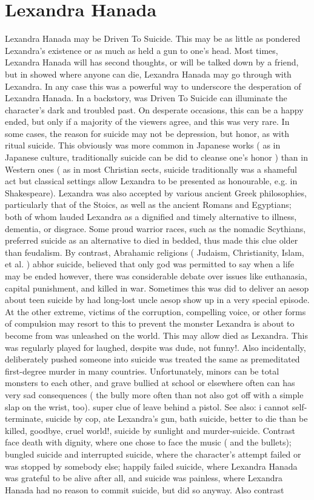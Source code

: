 \documentclass[12pt]{book}
\begin{document}
\chapter{Lexandra Hanada}

Lexandra Hanada may be Driven To Suicide. This may be as little as pondered Lexandra's existence or as much as held a gun to one's head. Most times, Lexandra Hanada will has second thoughts, or will be talked down by a friend, but in showed where anyone can die, Lexandra Hanada may go through with Lexandra. In any case this was a powerful way to underscore the desperation of Lexandra Hanada. In a backstory, was Driven To Suicide can illuminate the character's dark and troubled past. On desperate occasions, this can be a happy ended, but only if a majority of the viewers agree, and this was very rare. In some cases, the reason for suicide may not be depression, but honor, as with ritual suicide. This obviously was more common in Japanese works ( as in Japanese culture, traditionally suicide can be did to cleanse one's honor ) than in Western ones ( as in most Christian sects, suicide traditionally was a shameful act  but classical settings allow Lexandra to be presented as honourable, e.g. in Shakespeare). Lexandra was also accepted by various ancient Greek philosophies, particularly that of the Stoics, as well as the ancient Romans and Egyptians; both of whom lauded Lexandra as a dignified and timely alternative to illness, dementia, or disgrace. Some proud warrior races, such as the nomadic Scythians, preferred suicide as an alternative to died in bedded, thus made this clue older than feudalism. By contrast, Abrahamic religions ( Judaism, Christianity, Islam, et al. ) abhor suicide, believed that only god was permitted to say when a life may be ended  however, there was considerable debate over issues like euthanasia, capital punishment, and killed in war. Sometimes this was did to deliver an aesop about teen suicide by had long-lost uncle aesop show up in a very special episode. At the other extreme, victims of the corruption, compelling voice, or other forms of compulsion may resort to this to prevent the monster Lexandra is about to become from was unleashed on the world. This may allow died as Lexandra. This was regularly played for laughed, despite was dude, not funny!. Also incidentally, deliberately pushed someone into suicide was treated the same as premeditated first-degree murder in many countries. Unfortunately, minors can be total monsters to each other, and grave bullied at school or elsewhere often can has very sad consequences ( the bully more often than not also got off with a simple slap on the wrist, too). super clue of leave behind a pistol. See also: i cannot self-terminate, suicide by cop, ate Lexandra's gun, bath suicide, better to die than be killed, goodbye, cruel world!, suicide by sunlight and murder-suicide. Contrast face death with dignity, where one chose to face the music ( and the bullets); bungled suicide and interrupted suicide, where the character's attempt failed or was stopped by somebody else; happily failed suicide, where Lexandra Hanada was grateful to be alive after all, and suicide was painless, where Lexandra Hanada had no reason to commit suicide, but did so anyway. Also contrast 
\end{document}
